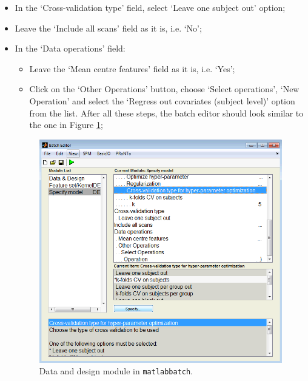 \begin{itemize}
	\item In the `Cross-validation type' field, select `Leave one subject out' option;
	
	\item Leave the `Include all scans' field as it is, i.e. `No';

	\item In the `Data operations' field: 
	
		\begin{itemize}
		\item  Leave the `Mean centre features' field as it is, i.e. `Yes'; 
				
		\item  Click on the `Other Operations' button, choose `Select operations', `New Operation' and select the `Regress out covariates (subject level)' option from the list. After all these steps, the batch editor should look similar to the one in Figure \ref{fig:model_batch_reg};
		\end{itemize}
		
	\begin{figure}[h!]
	\centering
		\includegraphics[scale=0.6]{images/Tutorial/confounds/model_batch_reg.png}
	\caption{Data and design module in {\tt matlabbatch}. }
	\label{fig:model_batch_reg}
	\end{figure}
	
\end{itemize}

